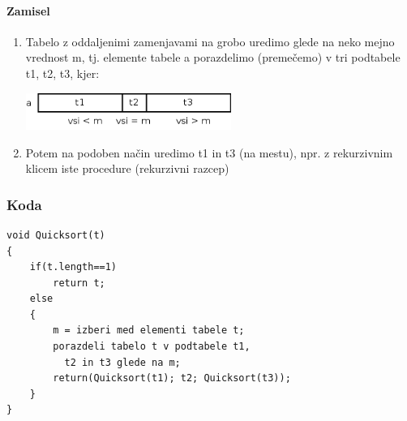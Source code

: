 \documentclass[a4paper,10pt]{article}
\begin{document}
\paragraph{Zamisel}
\begin{enumerate}
\item Tabelo z oddaljenimi zamenjavami na grobo uredimo glede na neko mejno vrednost m, tj. elemente tabele a porazdelimo (preme\v cemo) v tri podtabele t1, t2, t3, kjer:
	\begin{center}
	\includegraphics[width=6.7cm,height=1.2cm]{Slike/QuickSortTabela1.png}
	\end{center}
\item Potem na podoben na\v cin uredimo t1 in t3 (na mestu), npr. z rekurzivnim klicem iste procedure (rekurzivni razcep)
\end{enumerate}

\subsubsection{Koda}

\begin{lstlisting}
void Quicksort(t)
{
	if(t.length==1)
		return t;
	else
	{
		m = izberi med elementi tabele t;
		porazdeli tabelo t v podtabele t1, 
		  t2 in t3 glede na m;
		return(Quicksort(t1); t2; Quicksort(t3));
	}
}
\end{lstlisting}

\vspace{10pt}
\end{document}
